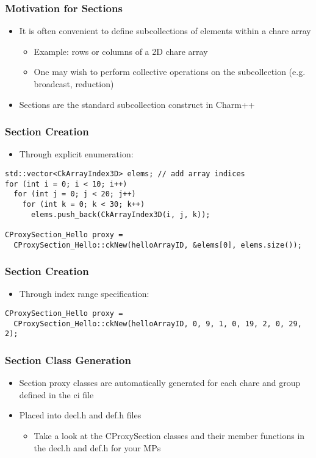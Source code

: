 \begin{frame}[fragile]
\frametitle{Motivation for Sections}
\begin{itemize}
 \item It is often convenient to define subcollections of elements within a
   chare array
   \begin{itemize}
   \item Example: rows or columns of a 2D chare array
   \item One may wish to perform collective operations on the subcollection
     (e.g. broadcast, reduction)
   \end{itemize}
 \item Sections are the standard subcollection construct in Charm++
\end{itemize}
\end{frame}

\begin{frame}[fragile]
\frametitle{Section Creation}
\begin{itemize}
 \item Through explicit enumeration:
\end{itemize}

\begin{lstlisting}
std::vector<CkArrayIndex3D> elems; // add array indices
for (int i = 0; i < 10; i++)
  for (int j = 0; j < 20; j++)
    for (int k = 0; k < 30; k++)
      elems.push_back(CkArrayIndex3D(i, j, k));

CProxySection_Hello proxy =
  CProxySection_Hello::ckNew(helloArrayID, &elems[0], elems.size());
\end{lstlisting}
\end{frame}

\begin{frame}[fragile]
\frametitle{Section Creation}
\begin{itemize}
 \item Through index range specification:
\end{itemize}

\begin{lstlisting}
CProxySection_Hello proxy =
  CProxySection_Hello::ckNew(helloArrayID, 0, 9, 1, 0, 19, 2, 0, 29, 2);
\end{lstlisting}
\end{frame}

\begin{frame}[fragile]
\frametitle{Section Class Generation}
\begin{itemize}
 \item Section proxy classes are automatically generated for each chare and group defined in the ci file
 \item Placed into decl.h and def.h files
   \begin{itemize}
   \item Take a look at the CProxySection classes and their member functions in
     the decl.h and def.h for your MPs
   \end{itemize}
\end{itemize}
\end{frame}

